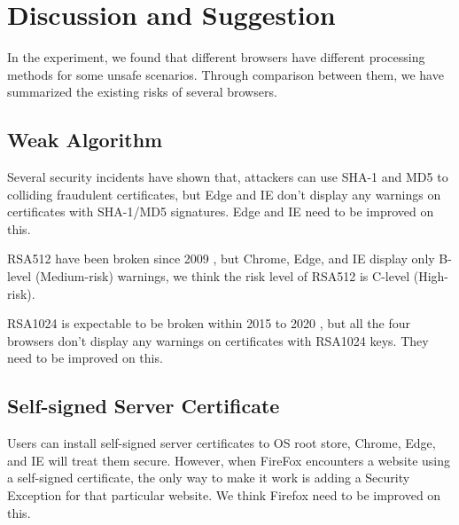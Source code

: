\section{Discussion and Suggestion}
In the experiment, we found that different browsers have different processing methods for some unsafe scenarios. Through comparison between them, we have summarized the existing risks of several browsers.

\subsection{Weak Algorithm}
    Several security incidents have shown that,
        attackers can use SHA-1 and MD5 to colliding fraudulent certificates,
    but Edge and IE don't display any warnings on certificates with SHA-1/MD5 signatures.
    Edge and IE need to be improved on this.

    RSA512 have been broken since 2009 \cite{cavallar2000factorization}, but Chrome, Edge, and IE display only B-level (Medium-risk) warnings, we think the risk level of RSA512 is C-level (High-risk).

    RSA1024 is expectable to be broken within 2015 to 2020 \cite{Berlin2017An},
    but all the four browsers don't display any warnings on certificates with RSA1024 keys.
    They need to be improved on this.


\subsection{Self-signed Server Certificate}
    Users can install self-signed server certificates to OS root store, Chrome,
        Edge, and IE will treat them secure.
    However, when FireFox encounters a website using a self-signed certificate,
        the only way to make it work is adding a Security Exception for that particular website.
    We think Firefox need to be improved on this.

